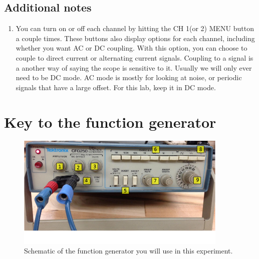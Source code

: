 \subsection*{Additional notes}
\begin{enumerate}
\item You can turn on or off each channel by hitting the CH 1(or 2) MENU button a couple times. These buttons also display options for each channel, including whether you want AC or DC coupling. With this option, you can choose to couple to direct current or alternating current signals. Coupling to a signal is a another way of saying the scope is sensitive to it. Usually we will only ever need to be DC mode. AC mode is mostly for looking at noise, or periodic signals that have a large offset. For this lab, keep it in DC mode.
\end{enumerate}

\newpage

\section*{Key to the function generator}

\begin{figure}[h!]
        \centering
            \includegraphics[width=0.9\textwidth]{./Exp9/pic/fgen.png}
        \caption{Schematic of the function generator you will use in this experiment.}
        \label{fig:gen}
\end{figure}

